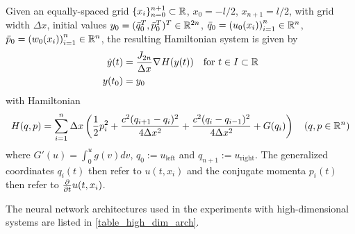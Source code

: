 \documentclass[twoside,a4paper]{article}
\begin{document}
Given an equally-spaced grid $\{ x_i \}_{n=0}^{n+1} \subset \mathbb{R}$, $x_0 = -l/2$, $x_{n+1} = l/2$,
with grid width $\Delta x$,
initial values $y_0 = (\bar{q}_0^T, \bar{p}_0^T)^T \in \mathbb{R}^{2n}$, $\bar{q}_0 = \left( u_0(x_i) \right)_{i=1}^n \in \mathbb{R}^n$, 
$\bar{p}_0 = \left( w_0(x_i) \right)_{i=1}^n \in \mathbb{R}^n$,
the resulting Hamiltonian system is given by
\begin{align*}
	\dot{y}(t) &= \frac{J_{2n}}{\Delta x} \nabla_{}{H}(y(t)) \quad \text{for } t \in I \subset \mathbb{R} \\
	y(t_0) &= y_0
\end{align*}
with Hamiltonian
\begin{equation*}
	H(q,p) = \sum_{i=1}^n \Delta x \left( 
	\frac{1}{2} p_i^2 + \frac{c^2 (q_{i+1} - q_i)^2}{4 \Delta x^2} 
	+ \frac{c^2 (q_i - q_{i-1})^2}{4 \Delta x^2} + G(q_i)
	\right)
	\quad (q,p \in \mathbb{R}^n)
\end{equation*}
where $G'(u) = \int_0^u g(v) dv$, $q_0 := u_{\text{left}}$ and $q_{n+1} := u_{\text{right}}$.
The generalized coordinates $q_i(t)$ then refer to $u(t,x_i)$ and 
the conjugate momenta $p_i(t)$ then refer to $\frac{\partial }{\partial t} u(t,x_i)$.

The neural network architectures used in the experiments with high-dimensional systems
are listed in \cref{table_high_dim_arch}.
\end{document}
